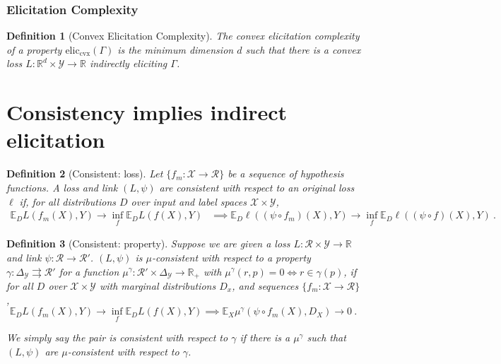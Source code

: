 \documentclass{article}
\newcommand{\Comments}{1}
\newcommand{\mynote}[2]{\ifnum\Comments=1\textcolor{#1}{#2}\fi}
\newcommand{\jessie}[1]{\mynote{purple}{[JF: #1]}}
\newcommand{\reals}{\mathbb{R}}
\newcommand{\simplex}{\Delta_\Y}
\newcommand{\eliccvx}{\mathrm{elic}_\mathrm{cvx}}
\newcommand{\E}{\mathbb{E}}
\newcommand{\R}{\mathcal{R}}
\newcommand{\X}{\mathcal{X}}
\newcommand{\Y}{\mathcal{Y}}
\newcommand{\toto}{\rightrightarrows}
\newtheorem{definition}{Definition}
\begin{document}
\subsubsection{Elicitation Complexity}\label{subsec:elic-cplx}

\begin{definition}[Convex Elicitation Complexity]
	The \emph{convex elicitation complexity} of a property $\eliccvx(\Gamma)$ is the minimum dimension $d$ such that there is a convex loss $L : \reals^d \times \Y \to \reals$ indirectly eliciting $\Gamma$.
\end{definition}


\section{Consistency implies indirect elicitation}\label{sec:consis-implies-indir}
\begin{definition}[Consistent: loss]
	Let $\{f_m : \X \to \R\}$ be a sequence of hypothesis functions.
	A loss and link $(L,\psi)$ are consistent with respect to an original loss $\ell$ if, for all distributions $D$ over input and label spaces $\X \times\Y$, 
	\begin{align*}
	\E_D L(f_m(X), Y) \to \inf_f \E_D L(f(X), Y) &\implies \E_D \ell((\psi \circ f_m)(X), Y) \to \inf_f \E_D \ell((\psi \circ f)(X), Y)~.~
	\end{align*}
\end{definition}

\begin{definition}[Consistent: property]
	Suppose we are given a loss $L : \R \times \Y \to \reals$ and link $\psi : \R \to \R'$.
	$(L, \psi)$ is \emph{$\mu$-consistent with respect to a property} $\gamma: \simplex \toto \R'$ for a function $\mu^\gamma:\R' \times \simplex \to \reals_+$ with $\mu^\gamma(r,p) = 0 \iff r \in \gamma(p)$, if for all $D$ over $\X \times \Y$ with marginal distributions $D_x$, and sequences $\{f_m: \X \to \R\}$, 
	\begin{equation}
	\E_{D} L(f_m(X), Y) \to \inf_f \E_{D} L( f(X), Y) \implies \E_X \mu^\gamma(\psi \circ f_m(X), D_X) \to 0~.~
	\end{equation}
	
	We simply say the pair is consistent with respect to $\gamma$ if there is a $\mu^\gamma$ such that $(L,\psi)$ are $\mu$-consistent with respect to $\gamma$.
\end{definition}
\end{document}
